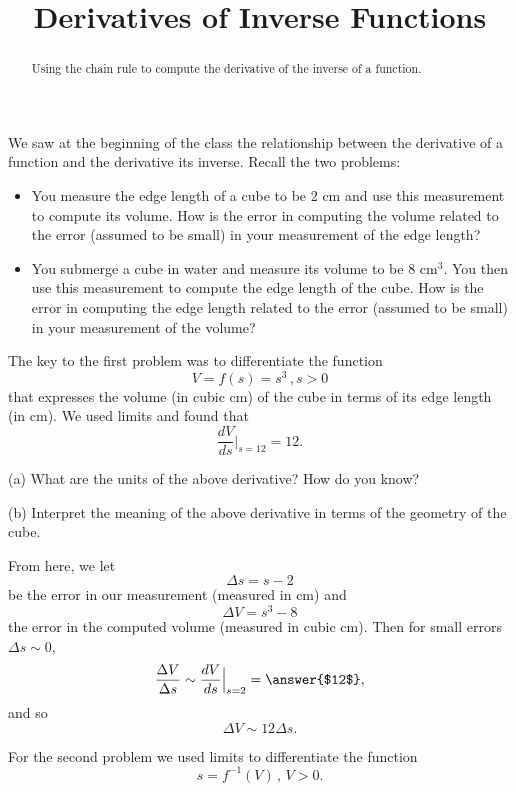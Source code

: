 \documentclass{ximera}
\title{Derivatives of Inverse Functions}
\begin{document}
\begin{abstract}
Using the chain rule to compute the derivative of the inverse of a function.
\end{abstract}
\maketitle

We saw at the beginning of the class the relationship between the derivative of a function and the derivative its inverse. Recall the two problems:

\begin{itemize}
\item{You measure the edge length of a cube to be $2$ cm and use this measurement to compute its volume. How is the error in computing the volume related to the error (assumed to be small) in your measurement of the edge length?}

\item{You submerge a cube in water and measure its volume to be $8 \text{ cm}^3$. You then use this measurement to compute the edge length of the cube. How is the error in computing the edge length related to the error (assumed to be small) in your measurement of the volume?}

\end{itemize}

The key to the first problem was to differentiate the function
\[
      V = f(s) = s^3 \, , s>0
\] 
that expresses the volume (in cubic cm) of the cube in terms of its edge length (in cm). We used limits and found that
\[
   \frac{dV}{ds}\Big|_{s=12} = 12 .
\]

\begin{question} \label{Q34rgbds}
(a) What are the units of the above derivative? How do you know?

(b) Interpret the meaning of the above derivative in terms of the geometry of the cube.
\end{question}

From here, we let 
\[
         \Delta s = s- 2
\]
be the error in our measurement (measured in cm) and 
\[
      \Delta V = s^3 -  8
\]
the error in the computed volume (measured in cubic cm). Then for small errors $\Delta s \sim 0$, 
\[
       \frac{\Delta V}{\Delta s} \sim  \frac{dV}{ds}\Big|_{s=2} = \answer{$12$} ,
\]
and so
\[
       \Delta V \sim 12 \Delta s.
\]

For the second problem we used limits to differentiate the function
\[
    s = f^{-1}(V) \, , \, V>0. 
\] 
\end{document}
